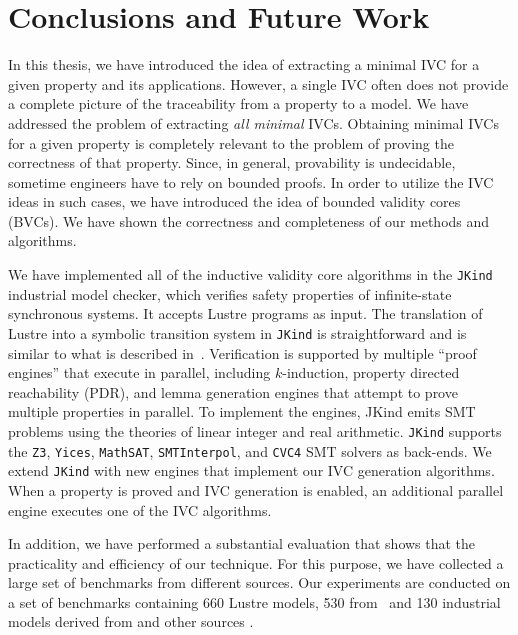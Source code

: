 \chapter{Conclusions and Future Work}

In this thesis, we have introduced the idea of extracting a minimal IVC for a given property and its applications.  However, a single IVC often does not provide a complete picture of the traceability from a property to a model.  We have addressed the problem of extracting {\em all minimal} IVCs. Obtaining minimal IVCs for a given property is completely relevant to the problem of proving the correctness of that property. Since, in general, provability is undecidable, sometime engineers have to rely on bounded proofs. In order to utilize the IVC ideas in such cases, we have introduced the idea of bounded validity cores (BVCs).
We have shown
the correctness and completeness of our methods and algorithms.

We have implemented all of the inductive validity core algorithms in the \texttt{JKind} ~\cite{jkind} industrial model checker,
which verifies safety properties of infinite-state synchronous systems.
It accepts Lustre programs \cite{Halbwachs91:lustre} as input.  The translation of Lustre
into a symbolic transition system in \texttt{JKind} is straightforward and is similar to what is described
in~\cite{Hagen08:FMCAD}.
Verification is supported by multiple ``proof engines'' that execute in parallel, including $k$-induction,
property directed reachability (PDR), and lemma generation engines that attempt to prove
multiple properties in parallel.  To implement the engines,
JKind emits SMT problems using the theories of linear integer and real arithmetic. \texttt{JKind} supports the \texttt{Z3}, \texttt{Yices}, \texttt{MathSAT}, \texttt{SMTInterpol}, and \texttt{CVC4} SMT solvers as back-ends.  We extend \texttt{JKind} with new engines that implement our IVC generation algorithms. When a property is
proved and IVC generation is enabled, an additional parallel engine
executes one of the IVC algorithms.


In addition, we have performed a substantial evaluation that shows that the practicality and efficiency of our technique. For this purpose, we have collected a large set of benchmarks from different sources. Our experiments are conducted on a set of benchmarks containing 660 Lustre models, 530 from~\cite{Hagen08:FMCAD, piskac2016} and 130 industrial models derived from \cite{hilt2013} and other sources \cite{piskac2016, NFM2015:backes}.


